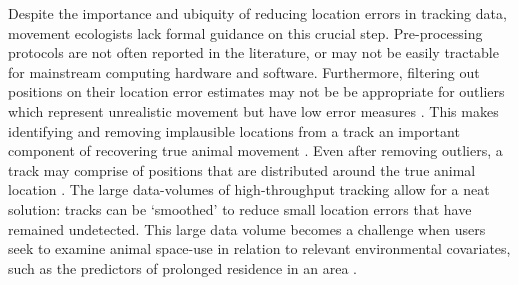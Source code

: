 \documentclass[10pt,paper=a4,headings=standardclasses
]{scrartcl}
\begin{document}
Despite the importance and ubiquity of reducing location errors in tracking data, movement ecologists lack formal guidance on this crucial step.
Pre-processing protocols are not often reported in the literature, or may not be easily tractable for mainstream computing hardware and software.
Furthermore, filtering out positions on their location error estimates may not be be appropriate for outliers which represent unrealistic movement but have low error measures \citep{weiser2016, ranacher2016}.
This makes identifying and removing implausible locations from a track an important component of recovering true animal movement \citep{bjorneraas2010}.
Even after removing outliers, a track may comprise of positions that are distributed around the true animal location \citep{noonan2019}.
The large data-volumes of high-throughput tracking allow for a neat solution: tracks can be `smoothed' to reduce small location errors that have remained undetected.
This large data volume becomes a challenge when users seek to examine animal space-use in relation to relevant environmental covariates, such as the predictors of prolonged residence in an area \citep[see][]{bracis2018, aarts2008, fleming2014a,bijleveld2016, oudman2018, harel2016}.
\end{document}
